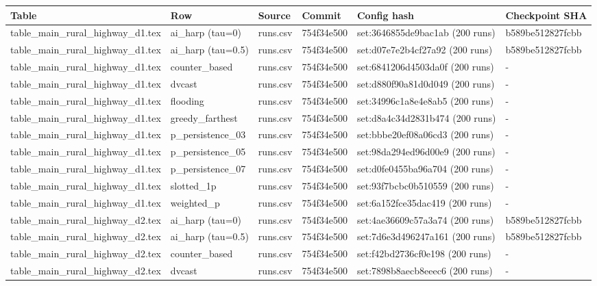 \begin{tabular}{llllll}
\toprule
Table & Row & Source & Commit & Config hash & Checkpoint SHA \\
\midrule
table\_main\_rural\_highway\_d1.tex & ai\_harp (tau=0) & runs.csv & 754f34e500 & set:3646855de9bac1ab (200 runs) & b589be512827fcbb \\
table\_main\_rural\_highway\_d1.tex & ai\_harp (tau=0.5) & runs.csv & 754f34e500 & set:d07e7e2b4cf27a92 (200 runs) & b589be512827fcbb \\
table\_main\_rural\_highway\_d1.tex & counter\_based & runs.csv & 754f34e500 & set:6841206d4503da0f (200 runs) & - \\
table\_main\_rural\_highway\_d1.tex & dvcast & runs.csv & 754f34e500 & set:d880f90a81d0d049 (200 runs) & - \\
table\_main\_rural\_highway\_d1.tex & flooding & runs.csv & 754f34e500 & set:34996c1a8e4e8ab5 (200 runs) & - \\
table\_main\_rural\_highway\_d1.tex & greedy\_farthest & runs.csv & 754f34e500 & set:d8a4c34d2831b474 (200 runs) & - \\
table\_main\_rural\_highway\_d1.tex & p\_persistence\_03 & runs.csv & 754f34e500 & set:bbbe20ef08a06cd3 (200 runs) & - \\
table\_main\_rural\_highway\_d1.tex & p\_persistence\_05 & runs.csv & 754f34e500 & set:98da294ed96d00e9 (200 runs) & - \\
table\_main\_rural\_highway\_d1.tex & p\_persistence\_07 & runs.csv & 754f34e500 & set:d0fe0455ba96a704 (200 runs) & - \\
table\_main\_rural\_highway\_d1.tex & slotted\_1p & runs.csv & 754f34e500 & set:93f7bcbc0b510559 (200 runs) & - \\
table\_main\_rural\_highway\_d1.tex & weighted\_p & runs.csv & 754f34e500 & set:6a152fce35dac419 (200 runs) & - \\
table\_main\_rural\_highway\_d2.tex & ai\_harp (tau=0) & runs.csv & 754f34e500 & set:4ae36609c57a3a74 (200 runs) & b589be512827fcbb \\
table\_main\_rural\_highway\_d2.tex & ai\_harp (tau=0.5) & runs.csv & 754f34e500 & set:7d6e3d496247a161 (200 runs) & b589be512827fcbb \\
table\_main\_rural\_highway\_d2.tex & counter\_based & runs.csv & 754f34e500 & set:f42bd2736cf0e198 (200 runs) & - \\
table\_main\_rural\_highway\_d2.tex & dvcast & runs.csv & 754f34e500 & set:7898b8aecb8eeec6 (200 runs) & - \\

\end{tabular}
